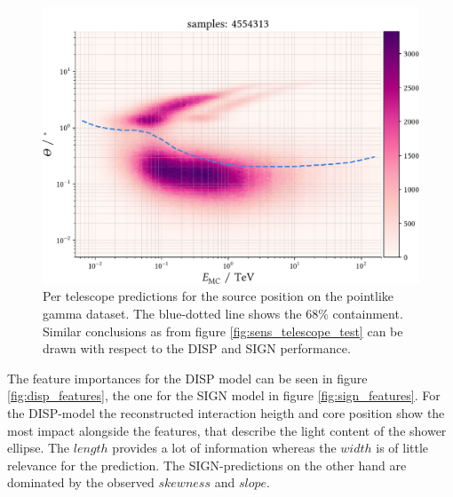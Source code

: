 \begin{figure}
    \centering
    \captionsetup{width=0.9\linewidth}
    \includegraphics[width=.9\textwidth]{../analysis/plots/gamma/tel_vs_energy.pdf}
    \caption{Per telescope predictions for the source position on the pointlike 
    gamma dataset. The blue-dotted line shows the 68\% containment. 
    Similar conclusions as from figure \ref{fig:sens_telescope_test} can be drawn
    with respect to the DISP and SIGN performance.}
    \label{fig:sens_telescope}
\end{figure}


The feature importances for the DISP model can be seen in figure \ref{fig:disp_features},
the one for the SIGN model in figure \ref{fig:sign_features}.
For the DISP-model the reconstructed interaction heigth and core position
show the most impact alongside the features, that describe  the light content of
the shower ellipse. The $length$ provides a lot of information whereas the
$width$ is of little relevance for the prediction.
The SIGN-predictions on the other hand are dominated by the observed 
$skewness$ and $slope$.


